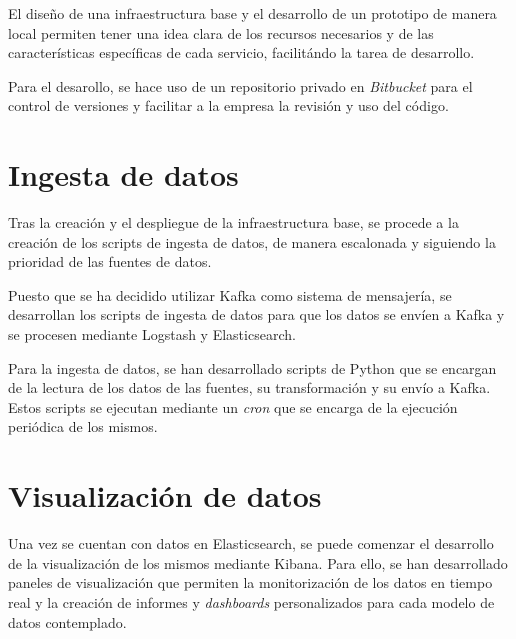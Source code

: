 El diseño de una infraestructura base y el desarrollo de un prototipo de manera
local permiten tener una idea clara de los recursos necesarios y de las
características específicas de cada servicio, facilitándo la tarea de
desarrollo.


Para el desarollo, se hace uso de un repositorio privado en \textit{Bitbucket}
para el control de versiones y facilitar a la empresa la revisión y uso del
código.


\newpage{}
\section{Ingesta de datos}\label{sec:impl_ingesta}
Tras la creación y el despliegue de la infraestructura base, se procede a la
creación de los scripts de ingesta de datos, de manera escalonada y siguiendo
la prioridad de las fuentes de datos.

Puesto que se ha decidido utilizar Kafka como sistema de mensajería, se
desarrollan los scripts de ingesta de datos para que los datos se envíen a
Kafka y se procesen mediante Logstash y Elasticsearch.

Para la ingesta de datos, se han desarrollado scripts de Python que se encargan
de la lectura de los datos de las fuentes, su transformación y su envío a Kafka.
Estos scripts se ejecutan mediante un \textit{cron} que se encarga de la
ejecución periódica de los mismos.


\newpage{}
\section{Visualización de datos}\label{sec:impl_visualizacion}
Una vez se cuentan con datos en Elasticsearch, se puede comenzar el desarrollo
de la visualización de los mismos mediante Kibana. Para ello, se han desarrollado
paneles de visualización que permiten la monitorización de los datos en tiempo
real y la creación de informes y \textit{dashboards} personalizados para cada
modelo de datos contemplado.
